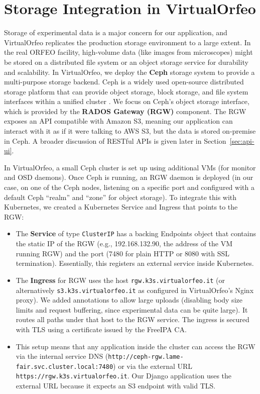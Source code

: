 \section{Storage Integration in VirtualOrfeo} \label{sec:virtualorfeo-storage}

Storage of experimental data is a major concern for our application, and 
VirtualOrfeo replicates the production storage environment to a large extent. In 
the real ORFEO facility, high-volume data (like images from microscopes) might 
be stored on a distributed file system or an object storage service for 
durability and scalability. In VirtualOrfeo, we deploy the \textbf{Ceph} storage 
system to provide a multi-purpose storage backend. Ceph is a widely used 
open-source distributed storage platform that can provide object storage, block 
storage, and file system interfaces within a unified cluster 
\parencite{Weil2006Ceph}. We focus on Ceph’s object storage interface, which is 
provided by the \textbf{RADOS Gateway (RGW)} component. The RGW exposes an API 
compatible with Amazon S3, meaning our application can interact with it as if it 
were talking to AWS S3, but the data is stored on-premise in Ceph. A broader 
discussion of RESTful APIs is given later in Section~\ref{sec:api-ui}.


\medskip

In VirtualOrfeo, a small Ceph cluster is set up using additional VMs (for monitor 
and OSD daemons). Once Ceph is running, an RGW daemon is deployed (in our case, 
on one of the Ceph nodes, listening on a specific port and configured with a 
default Ceph ``realm'' and ``zone'' for object storage). To integrate this with 
Kubernetes, we created a Kubernetes Service and Ingress that points to the RGW:  

\begin{itemize}
	\item The \textbf{Service} of type \texttt{ClusterIP} has a backing Endpoints 
	object that contains the static IP of the RGW (e.g., 192.168.132.90, the 
	address of the VM running RGW) and the port (7480 for plain HTTP or 8080 with 
	SSL termination). Essentially, this registers an external service inside 
	Kubernetes.  
	\item The \textbf{Ingress} for RGW uses the host \texttt{rgw.k3s.virtualorfeo.it} 
	(or alternatively \texttt{s3.k3s.virtualorfeo.it} as configured in 
	VirtualOrfeo’s Nginx proxy). We added annotations to allow large uploads 
	(disabling body size limits and request buffering, since experimental data can 
	be quite large). It routes all paths under that host to the RGW service. The 
	ingress is secured with TLS using a certificate issued by the FreeIPA CA.  
	\item This setup means that any application inside the cluster can access the 
	RGW via the internal service DNS 
	(\texttt{http://ceph-rgw.lame-fair.svc.cluster.local:7480}) or via the 
	external URL \texttt{https://rgw.k3s.virtualorfeo.it}. Our Django application 
	uses the external URL because it expects an S3 endpoint with valid TLS.  
\end{itemize}


